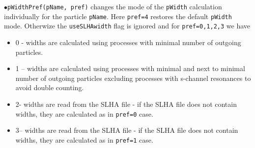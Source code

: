 \documentclass[12pt,a4paper]{article}
\begin{document}
\noindent
$\bullet$\verb|pWidthPref(pName, pref)| changes the mode of the {\tt pWidth} calculation individually for the particle {\tt pName}. Here {\tt pref=4} restores the default {\tt pWidth} mode. Otherwize the 
{\tt useSLHAwidth}  flag is ignored and for {\tt pref=0,1,2,3} we have    
%
%
\begin{itemize}
\item{} 0 -  widths are calculated using processes with minimal number of outgoing particles.
\item{}1 -- widths are calculated using processes with minimal and next to minimal number of outgoing particles excluding
                       processes with  s-channel resonances to avoid double counting.
\item{} 2- widths are read from the SLHA file - if the SLHA file does not contain widths, they are calculated as in {\tt pref=0} case.
\item{} 3-- widths are read from the SLHA file - if the SLHA file does not contain widths, they are calculated as in {\tt pref=1} case.
\end{itemize}
\end{document}
